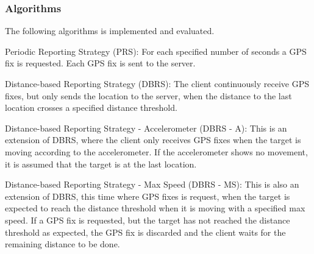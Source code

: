 \subsubsection{Algorithms}
The following algorithms is implemented and evaluated.

Periodic Reporting Strategy (PRS): For each specified number of seconds a GPS fix is requested. Each GPS fix is sent to the server.

Distance-based Reporting Strategy (DBRS): The client continuously receive GPS fixes, but only sends the location to the server, when the distance to the last location crosses a specified distance threshold.

Distance-based Reporting Strategy - Accelerometer (DBRS - A): This is an extension of DBRS, where the client only receives GPS fixes when the target is moving according to the accelerometer. If the accelerometer shows no movement, it is assumed that the target is at the last location.

Distance-based Reporting Strategy - Max Speed (DBRS - MS): This is also an extension of DBRS, this time where GPS fixes is request, when the target is expected to reach the distance threshold when it is moving with a specified max speed. If a GPS fix is requested, but the target has not reached the distance threshold as expected, the GPS fix is discarded and the client waits for the remaining distance to be done.